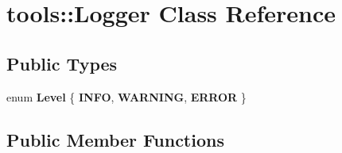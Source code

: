 \hypertarget{classtools_1_1Logger}{\section{tools\-:\-:Logger Class Reference}
\label{classtools_1_1Logger}
}
\subsection*{Public Types}
\begin{DoxyCompactItemize}
\item 
enum {\bfseries Level} \{ {\bfseries I\-N\-F\-O}, 
{\bfseries W\-A\-R\-N\-I\-N\-G}, 
{\bfseries E\-R\-R\-O\-R}
 \}
\end{DoxyCompactItemize}
\subsection*{Public Member Functions}
